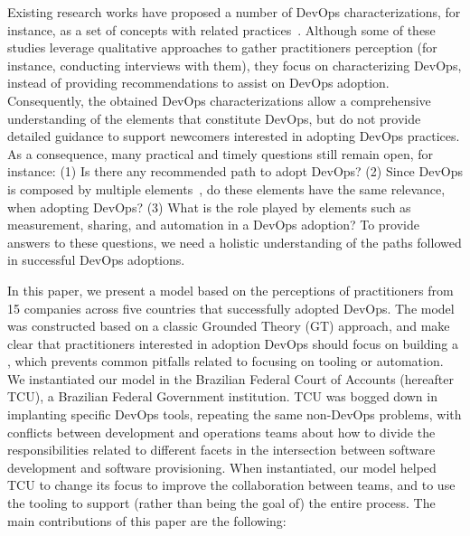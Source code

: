Existing research works have proposed a
number of DevOps characterizations, for instance, as a set of concepts with
related
practices~\cite{cooperation_dev_ops_esem_2014,devops_a_definition_xp_15,dimensions_of_devops_xp_15,extending_dimensions_icsea_16,characterizing_devops_sbes_2016,qualitative_devops_journalsw_17}. Although some
of these studies leverage qualitative approaches to gather practitioners perception (for instance,
conducting interviews with them), they focus on characterizing DevOps,
instead of providing recommendations to assist on DevOps adoption. Consequently,
the obtained DevOps characterizations allow a comprehensive understanding of
the elements that constitute DevOps, but do not provide detailed guidance to
support newcomers interested in adopting DevOps practices.
As a consequence, many practical and timely questions still remain open, for
instance: (1) Is there any recommended path to adopt DevOps? (2) Since
DevOps is composed by multiple elements~\cite{dimensions_of_devops_xp_15}, do
these elements have the same relevance, when adopting DevOps?
(3) What is the role played by elements such as measurement, sharing, and automation
in a DevOps adoption? To provide answers to these questions, we need a holistic
understanding of the paths followed in successful DevOps adoptions.

In this paper, we present a model based on the perceptions of practitioners from
15 companies across five countries that successfully adopted DevOps. The model
was constructed based on a classic Grounded Theory (GT) approach,
and make clear that practitioners interested in adoption DevOps should focus on building a
\cc, which prevents common pitfalls related to focusing on tooling or automation.
We instantiated our model in the Brazilian Federal Court of
Accounts (hereafter TCU), a Brazilian Federal Government institution. TCU was
bogged down in implanting specific DevOps tools, repeating the same non-DevOps
problems, with conflicts between development and operations teams about how to
divide the responsibilities related to different facets in the intersection
between software development and software provisioning. When instantiated,
our model helped TCU to change its focus to improve the collaboration between teams, and to use the tooling
to support (rather than being the goal of) the entire process.
The main contributions of this paper are the following:

